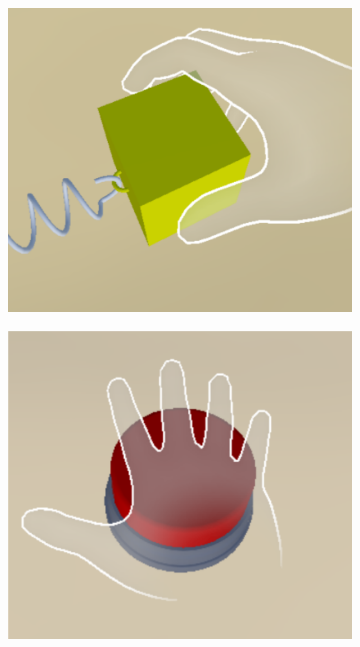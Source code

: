 \begin{figure}
  \begin{subfigure}{0.31\linewidth} %
    \centering
    \includegraphics[width=\linewidth]{image/predefined-gesture-puller.pdf}
    \caption{} %
    \label{fig:predefined-gestures-a}
  \end{subfigure}
  \hfill %
  \begin{subfigure}{0.31\linewidth} %
    \centering
    \includegraphics[width=\linewidth]{image/predefined-gesture-button.pdf}

\end{subfigure}
\end{figure}
